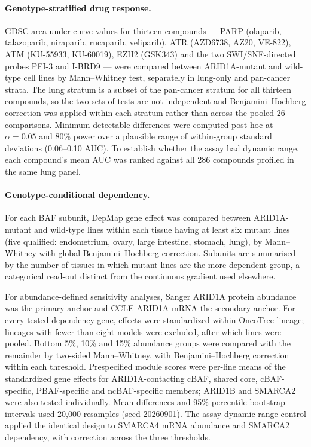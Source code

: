 \documentclass[11pt,a4paper]{article}
\begin{document}
\paragraph{Genotype-stratified drug response.} GDSC area-under-curve values for
thirteen compounds --- PARP (olaparib, talazoparib, niraparib, rucaparib,
veliparib), ATR (AZD6738, AZ20, VE-822), ATM (KU-55933, KU-60019), EZH2 (GSK343)
and the two SWI/SNF-directed probes PFI-3 and I-BRD9 --- were compared between
ARID1A-mutant and wild-type cell lines by Mann--Whitney test, separately in
lung-only and pan-cancer strata. The lung stratum is a subset of the pan-cancer
stratum for all thirteen compounds, so the two sets of tests are not independent
and Benjamini--Hochberg correction was applied within each stratum rather than
across the pooled 26 comparisons. Minimum detectable differences were computed
post hoc at $\alpha = 0.05$ and 80\% power over a plausible range of within-group
standard deviations (0.06--0.10 AUC). To establish whether the assay had dynamic
range, each compound's mean AUC was ranked against all 286 compounds profiled in
the same lung panel.

\paragraph{Genotype-conditional dependency.} For each BAF subunit, DepMap gene
effect was compared between ARID1A-mutant and wild-type lines within each tissue
having at least six mutant lines (five qualified: endometrium, ovary, large
intestine, stomach, lung), by Mann--Whitney with global Benjamini--Hochberg
correction. Subunits are summarised by the number of tissues in which mutant lines
are the more dependent group, a categorical read-out distinct from the continuous
gradient used elsewhere.

For abundance-defined sensitivity analyses, Sanger ARID1A protein abundance was
the primary anchor and CCLE ARID1A mRNA the secondary anchor. For every tested
dependency gene, effects were standardized within OncoTree lineage; lineages
with fewer than eight models were excluded, after which lines were pooled.
Bottom 5\%, 10\% and 15\% abundance groups were compared with the remainder by
two-sided Mann--Whitney, with Benjamini--Hochberg correction within each
threshold. Prespecified module scores were per-line means of the standardized
gene effects for ARID1A-contacting cBAF, shared core, cBAF-specific,
PBAF-specific and ncBAF-specific members; ARID1B and SMARCA2 were also tested
individually. Mean differences and 95\% percentile bootstrap intervals used
20{,}000 resamples (seed 20260901). The assay-dynamic-range control applied the
identical design to SMARCA4 mRNA abundance and SMARCA2 dependency, with correction
across the three thresholds.
\end{document}
